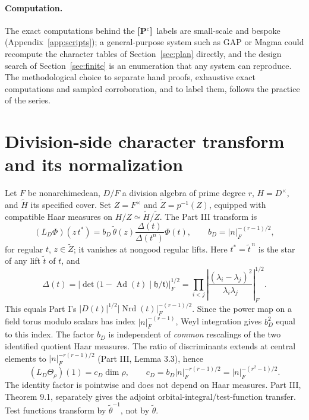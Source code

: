 \documentclass[11pt]{article}
\newcommand{\Nrd}{\operatorname{Nrd}}
\newcommand{\tH}{\widetilde H}
\newcommand{\tZ}{\widetilde Z}
\newcommand{\tth}{\widetilde\theta}
\newcommand{\Pctag}{\textnormal{\textbf{[P$^{\mathrm c}$]}}}
\theoremstyle{plain}
\theoremstyle{definition}
\begin{document}
\paragraph{Computation.}  The exact computations behind the \Pctag\
labels are small-scale and bespoke (Appendix~\ref{app:scripts}); a
general-purpose system such as GAP or Magma could recompute the
character tables of Section~\ref{sec:plan} directly, and the design
search of Section~\ref{sec:finite} is an enumeration that any system can
reproduce.  The methodological choice to separate hand proofs,
exhaustive exact computations and sampled corroboration, and to label
them, follows the practice of the series.

\section{Division-side character transform and its normalization}\label{sec:transform}
Let $F$ be nonarchimedean, $D/F$ a division algebra of prime
degree $r$, $H=D^\times$, and $\tH$ its specified cover.
Set $Z=F^\times$ and $\tZ=p^{-1}(Z)$, equipped with compatible
Haar measures on $H/Z\simeq\tH/\tZ$.  The Part III transform is
\begin{equation}\label{eq:LD}
 (L_D\Phi)(z\,t^*)
 =b_D\,\tth(z)
  \frac{\Delta(t)}{\Delta(t^n)}\Phi(t),\qquad
 b_D=|n|_F^{-(r-1)/2},
\end{equation}
for regular $t$, $z\in\tZ$; it vanishes at nongood regular lifts.
Here $t^*=\tilde t^{\,n}$ is the star of any lift $\tilde t$ of $t$, and
\begin{equation}\label{eq:Delta}
 \Delta(t)=\left|\det\bigl(1-\operatorname{Ad}(t)
 \mid\mathfrak h/\mathfrak t\bigr)\right|_F^{1/2}
 =\prod_{i<j}\left|
 \frac{(\lambda_i-\lambda_j)^2}{\lambda_i\lambda_j}
 \right|_F^{1/2}.
\end{equation}
This equals Part I's $|D(t)|^{1/2}|\Nrd(t)|_F^{-(r-1)/2}$.
Since the power map on a field torus modulo scalars has index
$|n|_F^{-(r-1)}$, Weyl integration gives $b_D^2$
equal to this index.  The factor $b_D$ is independent of
\emph{common} rescalings of the two identified quotient Haar
measures.  The ratio of discriminants extends at central elements
to $|n|_F^{-r(r-1)/2}$ (Part III, Lemma 3.3), hence
\begin{equation}\label{eq:cD}
 (L_D\Theta_\rho)(1)=c_D\dim\rho,\qquad
 c_D=b_D|n|_F^{-r(r-1)/2}
 =|n|_F^{-(r^2-1)/2}.
\end{equation}
The identity factor is pointwise and does not depend on Haar
measures.  Part III, Theorem 9.1, separately gives the adjoint
orbital-integral/test-function transfer.  Test functions transform
by $\tth^{-1}$, not by $\tth$.
\end{document}
